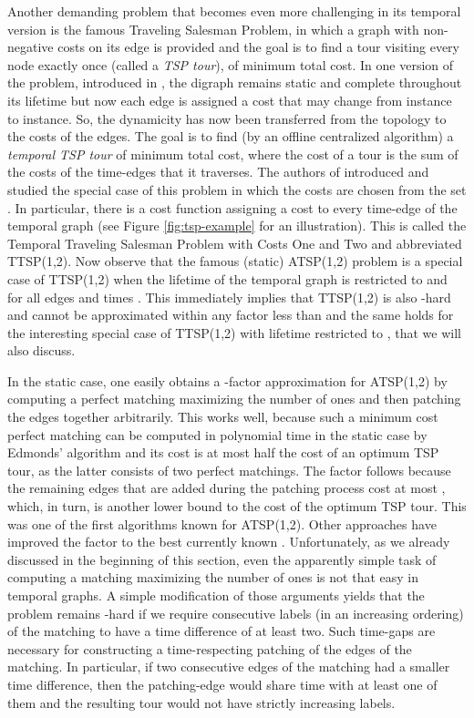 \documentclass[oribibl, 11pt]{llncs}
\begin{document}
Another demanding problem that becomes even more challenging in its temporal version is the famous {\sc Traveling Salesman Problem}, in which a graph with non-negative costs on its edge is provided and the goal is to find a tour visiting every node exactly once (called a \emph{TSP tour}), of minimum total cost. In one version of the problem, introduced in \cite{MS14}, the digraph remains static and complete throughout its lifetime but now each edge is assigned a cost that may change from instance to instance. So, the dynamicity has now been transferred from the topology to the costs of the edges. The goal is to find (by an offline centralized algorithm) a \emph{temporal TSP tour} of minimum total cost, where the cost of a tour is the sum of the costs of the time-edges that it traverses. The authors of \cite{MS14} introduced and studied the special case of this problem in which the costs are chosen from the set . In particular, there is a cost function  assigning a cost to every time-edge of the temporal graph (see Figure \ref{fig:tsp-example} for an illustration). This is called the {\sc Temporal Traveling Salesman Problem with Costs One and Two} and abbreviated TTSP(1,2). Now observe that the famous (static) ATSP(1,2) problem is a special case of TTSP(1,2) when the lifetime of the temporal graph  is restricted to  and  for all edges  and times . This immediately implies that TTSP(1,2) is also -hard \cite{PY93} and cannot be approximated within any factor less than  \cite{KS13} and the same holds for the interesting special case of TTSP(1,2) with lifetime restricted to , that we will also discuss.

In the static case, one easily obtains a -factor approximation for ATSP(1,2) by computing a perfect matching maximizing the number of ones and then patching the edges together arbitrarily. This works well, because such a minimum cost perfect matching can be computed in polynomial time in the static case by Edmonds' algorithm \cite{Ed65} and its cost is at most half the cost of an optimum TSP tour, as the latter consists of two perfect matchings. The  factor follows because the remaining  edges that are added during the patching process cost at most , which, in turn, is another lower bound to the cost of the optimum TSP tour. This was one of the first algorithms known for ATSP(1,2). Other approaches have improved the factor to the best currently known  \cite{Bl04}. Unfortunately, as we already discussed in the beginning of this section, even the apparently simple task of computing a matching maximizing the number of ones is not that easy in temporal graphs. A simple modification of those arguments yields that the problem remains -hard if we require consecutive labels (in an increasing ordering) of the matching to have a time difference of at least two. Such time-gaps are necessary for constructing a time-respecting patching of the edges of the matching. In particular, if two consecutive edges of the matching had a smaller time difference, then the patching-edge would share time with at least one of them and the resulting tour would not have strictly increasing labels.
\end{document}
